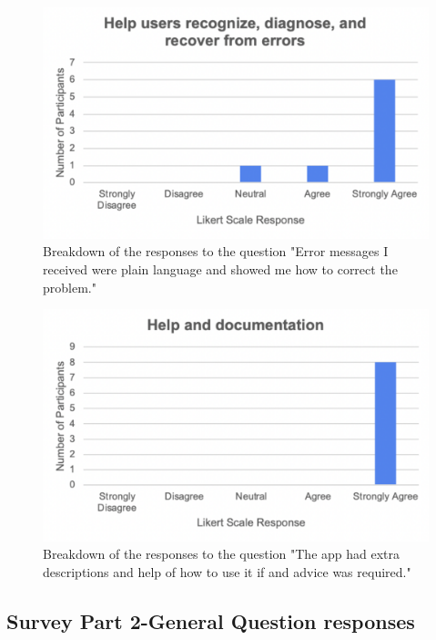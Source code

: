 \documentclass{l4proj}
\begin{document}
\begin{appendices}
\begin{figure}[H]
    \begin{centering}
    \includegraphics[scale=0.5]{images/heuristic9.pdf}
    \caption{Breakdown of the responses to the question "Error messages I received were plain language and showed me how to correct the problem."}
    \label{fig: heuristic9}
    \end{centering}
\end{figure}

\begin{figure}[H]
    \begin{centering}
    \includegraphics[scale=0.5]{images/heuristic10.pdf}
    \caption{Breakdown of the responses to the question "The app had extra descriptions and help of how to use it if and advice was required."}
    \label{fig: heuristic10}
    \end{centering}
\end{figure}

\subsection{Survey Part 2-General Question responses}


\end{appendices}
\end{document}
